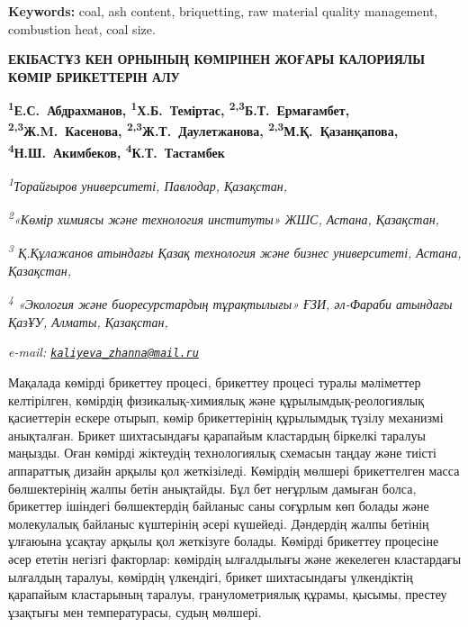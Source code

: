 {\bfseries Keywords:} coal, ash content, briquetting, raw material quality
management, combustion heat, coal size.

\begin{articleheader}
{\bfseries ЕКІБАСТҰЗ КЕН ОРНЫНЫҢ КӨМІРІНЕН ЖОҒАРЫ КАЛОРИЯЛЫ КӨМІР БРИКЕТТЕРІН АЛУ}

{\bfseries
\textsuperscript{1}Е.С.~Абдрахманов,
\textsuperscript{1}Х.Б.~Теміртас,
\textsuperscript{2,3}Б.Т.~Ермағамбет,
\textsuperscript{2,3}Ж.M.~Касенова,
\textsuperscript{2,3}Ж.Т.~Даулетжанова\textsuperscript{\envelope },
\textsuperscript{2,3}М.Қ.~Қазанқапова,
\textsuperscript{4}Н.Ш.~Акимбеков,
\textsuperscript{4}К.Т.~Тастамбек}
\end{articleheader}

\begin{affiliation}
\emph{\textsuperscript{1}Торайғыров университеті, Павлодар, Қазақстан,}

\emph{\textsuperscript{2}«Көмір химиясы және технология институты» ЖШС, Астана, Қазақстан,}

\emph{\textsuperscript{3} Қ.Құлажанов атындағы Қазақ технология және бизнес университеті, Астана, Қазақстан,}

\emph{\textsuperscript{4} «Экология және биоресурстардың тұрақтылығы» ҒЗИ, әл-Фараби атындағы ҚазҰУ, Алматы, Қазақстан,}

\emph{e-mail: \href{mailto:kaliyeva_zhanna@mail.ru}{\nolinkurl{kaliyeva\_zhanna@mail.ru}}}
\end{affiliation}

Мақалада көмірді брикеттеу процесі, брикеттеу процесі туралы мәліметтер
келтірілген, көмірдің физикалық-химиялық және құрылымдық-реологиялық
қасиеттерін ескере отырып, көмір брикеттерінің құрылымдық түзілу
механизмі анықталған. Брикет шихтасындағы қарапайым кластардың біркелкі
таралуы маңызды. Оған көмірді жіктеудің технологиялық схемасын таңдау
және тиісті аппараттық дизайн арқылы қол жеткізіледі. Көмірдің мөлшері
брикеттелген масса бөлшектерінің жалпы бетін анықтайды. Бұл бет неғұрлым
дамыған болса, брикеттер ішіндегі бөлшектердің байланыс саны соғұрлым
көп болады және молекулалық байланыс күштерінің әсері күшейеді.
Дәндердің жалпы бетінің ұлғаюына ұсақтау арқылы қол жеткізуге болады.
Көмірді брикеттеу процесіне әсер ететін негізгі факторлар: көмірдің
ылғалдылығы және жекелеген кластардағы ылғалдың таралуы, көмірдің
үлкендігі, брикет шихтасындағы үлкендіктің қарапайым кластарының
таралуы, гранулометриялық құрамы, қысымы, престеу ұзақтығы мен
температурасы, судың мөлшері.

